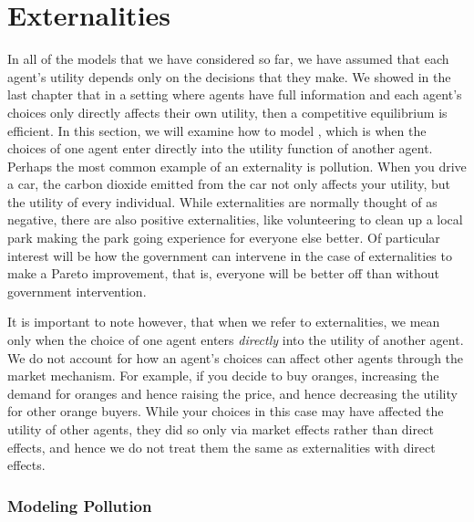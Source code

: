 \section{Externalities}
In all of the models that we have considered so far, we have assumed that each agent's utility depends only on the decisions that they make. We showed in the last chapter that in a setting where agents have full information and each agent's choices only directly affects their own utility, then a competitive equilibrium is efficient. In this section, we will examine how to model , which is when the choices of one agent enter directly into the utility function of another agent. Perhaps the most common example of an externality is pollution. When you drive a car, the carbon dioxide emitted from the car not only affects your utility, but the utility of every individual. While externalities are normally thought of as negative, there are also positive externalities, like volunteering to clean up a local park making the park going experience for everyone else better. Of particular interest will be how the government can intervene in the case of externalities to make a Pareto improvement, that is, everyone will be better off than without government intervention. 

It is important to note however, that when we refer to externalities, we mean only when the choice of one agent enters \emph{directly} into the utility of another agent. We do not account for how an agent's choices can affect other agents through the market mechanism. For example, if you decide to buy oranges, increasing the demand for oranges and hence raising the price, and hence decreasing the utility for other orange buyers. While your choices in this case may have affected the utility of other agents, they did so only via market effects rather than direct effects, and hence we do not treat them the same as externalities with direct effects. 

\subsubsection*{Modeling Pollution}
